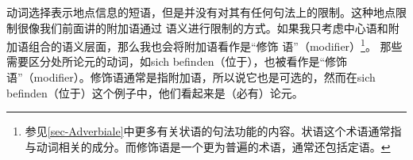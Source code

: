 %
%
动词选择表示地点信息的短语，但是并没有对其有任何句法上的限制。这种地点限制很像我们前面讲的附加语通过
语义进行限制的方式。如果我只考虑中心语和附加语组合的语义层面，那么我也会将附加语看作是“修饰
语”（modifier）\footnote{%
参见\ref{sec-Adverbiale}中更多有关状语的句法功能的内容。状语这个术语通常指与动词相关的成分。而修饰语是一个更为普遍的术语，通常还包括定语。}。
那些需要区分处所论元的动词，如sich befinden（位于），也被看作是“修饰语”（modifier）。修饰语通常是指附加语，所以说它也是可选的，然而在sich befinden（位于）这个例子中，他们看起来是（必有）论元。

